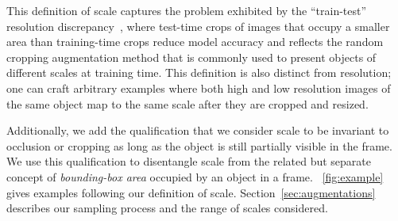 This definition of scale captures the problem exhibited by the ``train-test'' resolution discrepancy~\cite{NIPS2019_9035}, where test-time crops of images that occupy a smaller area than training-time crops reduce model accuracy and reflects the random cropping augmentation method that is commonly used to present objects of different scales at training time.
This definition is also distinct from resolution; one can craft arbitrary examples where both high and low resolution images of the same object map to the same scale after they are cropped and resized.

Additionally, we add the qualification that we consider scale to be invariant to occlusion or cropping as long as the object is still partially visible in the frame.
We use this qualification to disentangle scale from the related but separate concept of \emph{bounding-box area} occupied by an object in a frame.
~\autoref{fig:example} gives examples following our definition of scale. 
Section~\ref{sec:augmentations} describes our sampling process and the range of scales considered.

